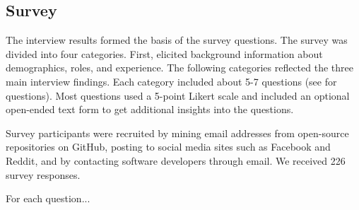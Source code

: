 \subsection{Survey}

The interview results formed the basis of the survey questions. The survey was divided into four categories. First, elicited background information about demographics, roles, and experience. The following categories reflected the three main interview findings. Each category included about 5-7 questions (see \cite{companion_site} for questions). Most questions used a 5-point Likert scale and included an optional open-ended text form to get additional insights into the questions. 

Survey participants were recruited by mining email addresses from open-source repositories on GitHub, posting to social media sites such as Facebook and Reddit, and by contacting software developers through email. We received 226 survey responses.

For each question...